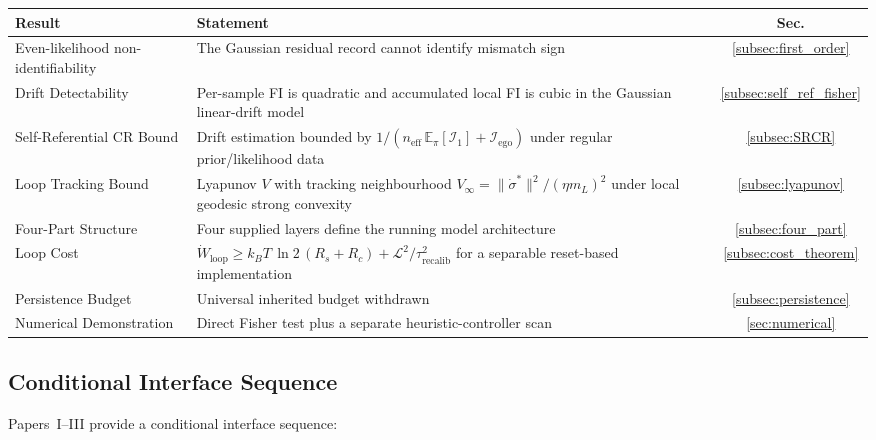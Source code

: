\documentclass[12pt]{article}
\begin{document}
\begin{center}
\small
\setlength{\tabcolsep}{4pt}%
\begin{tabular}{@{}lP{6cm}c@{}}
\toprule
\textbf{Result} & \textbf{Statement} & \textbf{Sec.} \\
\midrule
Even-likelihood non-identifiability
  & The Gaussian residual record cannot identify mismatch sign
  & \ref{subsec:first_order} \\[3pt]
Drift Detectability
  & Per-sample FI is quadratic and accumulated local FI is cubic in the
    Gaussian linear-drift model
  & \ref{subsec:self_ref_fisher} \\[3pt]
Self-Referential CR Bound
  & Drift estimation bounded by
    $1/(n_{\mathrm{eff}}\,\mathbb E_\pi[\mathcal I_1]
    + \mathcal{I}_{\mathrm{ego}})$ under regular prior/likelihood data
  & \ref{subsec:SRCR} \\[3pt]
Loop Tracking Bound
  & Lyapunov $V$ with tracking neighbourhood
    $V_\infty = \|\dot{\sigma}^*\|^2/(\eta m_L)^2$ under local
    geodesic strong convexity
  & \ref{subsec:lyapunov} \\[3pt]
Four-Part Structure
  & Four supplied layers define the running model architecture
  & \ref{subsec:four_part} \\[3pt]
Loop Cost
  & $\dot{W}_{\mathrm{loop}} \geq k_BT\,\ln 2\,(R_s+R_c)
    + \mathcal{L}^2/\tau_{\mathrm{recalib}}^2$
    for a separable reset-based implementation
  & \ref{subsec:cost_theorem} \\[3pt]
Persistence Budget
  & Universal inherited budget withdrawn
  & \ref{subsec:persistence} \\[3pt]
Numerical Demonstration
  & Direct Fisher test plus a separate heuristic-controller scan
  & \ref{sec:numerical} \\
\bottomrule
\end{tabular}
\end{center}

\subsection{Conditional Interface Sequence}
\label{subsec:logic_chain}

Papers~I--III provide a conditional interface sequence:
\end{document}
